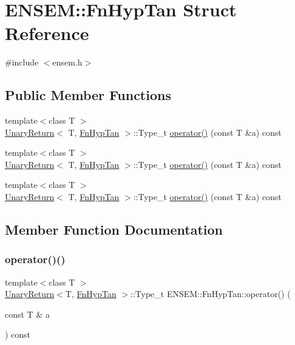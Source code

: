 \hypertarget{structENSEM_1_1FnHypTan}{}\section{E\+N\+S\+EM\+:\+:Fn\+Hyp\+Tan Struct Reference}
\label{structENSEM_1_1FnHypTan}


{\ttfamily \#include $<$ensem.\+h$>$}

\subsection*{Public Member Functions}
\begin{DoxyCompactItemize}
\item 
{\footnotesize template$<$class T $>$ }\\\mbox{\hyperlink{structENSEM_1_1UnaryReturn}{Unary\+Return}}$<$ T, \mbox{\hyperlink{structENSEM_1_1FnHypTan}{Fn\+Hyp\+Tan}} $>$\+::Type\+\_\+t \mbox{\hyperlink{structENSEM_1_1FnHypTan_a2a798b36a9dd79d1189263a0c58e0def}{operator()}} (const T \&a) const
\item 
{\footnotesize template$<$class T $>$ }\\\mbox{\hyperlink{structENSEM_1_1UnaryReturn}{Unary\+Return}}$<$ T, \mbox{\hyperlink{structENSEM_1_1FnHypTan}{Fn\+Hyp\+Tan}} $>$\+::Type\+\_\+t \mbox{\hyperlink{structENSEM_1_1FnHypTan_a2a798b36a9dd79d1189263a0c58e0def}{operator()}} (const T \&a) const
\item 
{\footnotesize template$<$class T $>$ }\\\mbox{\hyperlink{structENSEM_1_1UnaryReturn}{Unary\+Return}}$<$ T, \mbox{\hyperlink{structENSEM_1_1FnHypTan}{Fn\+Hyp\+Tan}} $>$\+::Type\+\_\+t \mbox{\hyperlink{structENSEM_1_1FnHypTan_a2a798b36a9dd79d1189263a0c58e0def}{operator()}} (const T \&a) const
\end{DoxyCompactItemize}


\subsection{Member Function Documentation}
\mbox{\label{structENSEM_1_1FnHypTan_a2a798b36a9dd79d1189263a0c58e0def}} 
\subsubsection{\texorpdfstring{operator()()}{operator()()}\hspace{0.1cm}{\footnotesize\ttfamily [1/3]}}
{\footnotesize\ttfamily template$<$class T $>$ \\
\mbox{\hyperlink{structENSEM_1_1UnaryReturn}{Unary\+Return}}$<$T, \mbox{\hyperlink{structENSEM_1_1FnHypTan}{Fn\+Hyp\+Tan}} $>$\+::Type\+\_\+t E\+N\+S\+E\+M\+::\+Fn\+Hyp\+Tan\+::operator() (\begin{DoxyParamCaption}\item[{const T \&}]{a }\end{DoxyParamCaption}) const\hspace{0.3cm}{\ttfamily [inline]}}

